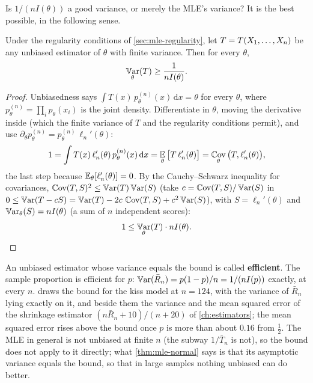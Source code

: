 Is $1/(nI(\theta))$ a good variance, or merely the MLE's variance?
It is the best possible, in the following sense.

\begin{theorem}
\label{thm:cramer-rao}
Under the regularity conditions of \cref{sec:mle-regularity}, let $T = T(X_1, \ldots, X_n)$ be any unbiased estimator of $\theta$ with finite variance.
Then for every $\theta$,
\[
\operatorname*{\mathbb{V}\text{ar}}_\theta(T) \geq \frac{1}{nI(\theta)}.
\]
\end{theorem}

\begin{proof}
Unbiasedness says $\int T(x)\,p_\theta^{(n)}(x)\,\mathrm{d}x = \theta$ for every $\theta$, where $p^{(n)}_\theta = \prod_i p_\theta(x_i)$ is the joint density.
Differentiate in $\theta$, moving the derivative inside (which the finite variance of $T$ and the regularity conditions permit), and use $\partial_\theta p^{(n)}_\theta = p^{(n)}_\theta\,\ell_n'(\theta)$:
\[
1 = \int T(x)\,\ell_n'(\theta)\,p^{(n)}_\theta(x)\,\mathrm{d}x = \operatorname*{\mathbb{E}}_\theta\big[T\,\ell_n'(\theta)\big] = \operatorname*{\mathbb{C}\text{ov}}_\theta\big(T, \ell_n'(\theta)\big),
\]
the last step because $\operatorname*{\mathbb{E}}_\theta[\ell_n'(\theta)] = 0$.
By the Cauchy--Schwarz inequality for covariances, $\operatorname*{\mathbb{C}\text{ov}}(T, S)^2 \leq \operatorname*{\mathbb{V}\text{ar}}(T)\operatorname*{\mathbb{V}\text{ar}}(S)$ (take $c = \operatorname*{\mathbb{C}\text{ov}}(T, S)/\operatorname*{\mathbb{V}\text{ar}}(S)$ in $0 \leq \operatorname*{\mathbb{V}\text{ar}}(T - cS) = \operatorname*{\mathbb{V}\text{ar}}(T) - 2c\,\operatorname*{\mathbb{C}\text{ov}}(T, S) + c^2\operatorname*{\mathbb{V}\text{ar}}(S)$), with $S = \ell_n'(\theta)$ and $\operatorname*{\mathbb{V}\text{ar}}_\theta(S) = nI(\theta)$ (a sum of $n$ independent scores):
\[
1 \leq \operatorname*{\mathbb{V}\text{ar}}_\theta(T)\cdot nI(\theta).
\]
\end{proof}

An unbiased estimator whose variance equals the bound is called \textbf{efficient}.
The sample proportion is efficient for $p$: $\operatorname*{\mathbb{V}\text{ar}}(\bar{R}_n) = p(1-p)/n = 1/(nI(p))$ exactly, at every $n$.
 draws the bound for the kiss model at $n = 124$, with the variance of $\bar{R}_n$ lying exactly on it, and beside them the variance and the mean squared error of the shrinkage estimator $(n\bar{R}_n + 10)/(n + 20)$ of \cref{ch:estimators}; the mean squared error rises above the bound once $p$ is more than about $0.16$ from $\frac12$.
The MLE in general is not unbiased at finite $n$ (the subway $1/\bar{T}_n$ is not), so the bound does not apply to it directly; what \cref{thm:mle-normal} says is that its asymptotic variance equals the bound, so that in large samples nothing unbiased can do better.

